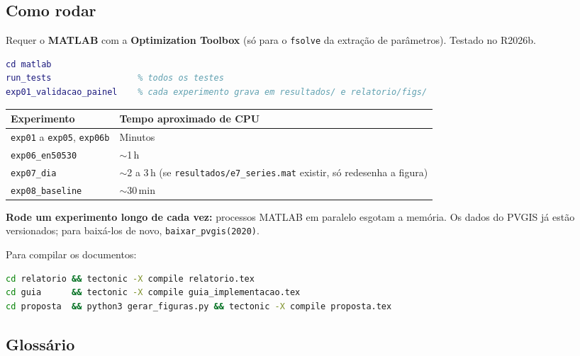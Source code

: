\subsection{Como rodar}

Requer o \textbf{MATLAB} com a \textbf{Optimization Toolbox} (s\'o para o \texttt{fsolve} da extra\c{c}\~ao de par\^ametros). Testado no R2026b.

\begin{lstlisting}[language=Matlab,style=matlabcod,numbers=none]
cd matlab
run_tests                 % todos os testes
exp01_validacao_painel    % cada experimento grava em resultados/ e relatorio/figs/
\end{lstlisting}

\begin{center}\small
\begin{tabular}{@{}ll@{}}
\toprule
Experimento & Tempo aproximado de CPU \\ \midrule
\texttt{exp01} a \texttt{exp05}, \texttt{exp06b} & Minutos \\
\texttt{exp06\_en50530} & $\sim$1\,h \\
\texttt{exp07\_dia} & $\sim$2 a 3\,h (se \texttt{resultados/e7\_series.mat} existir, s\'o redesenha a figura) \\
\texttt{exp08\_baseline} & $\sim$30\,min \\
\bottomrule
\end{tabular}
\end{center}

\textbf{Rode um experimento longo de cada vez:} processos MATLAB em paralelo esgotam a mem\'oria. Os dados do PVGIS j\'a est\~ao versionados; para baix\'a-los de novo, \texttt{baixar\_pvgis(2020)}.

Para compilar os documentos:
\begin{lstlisting}[language=bash,numbers=none,basicstyle=\ttfamily\scriptsize]
cd relatorio && tectonic -X compile relatorio.tex
cd guia      && tectonic -X compile guia_implementacao.tex
cd proposta  && python3 gerar_figuras.py && tectonic -X compile proposta.tex
\end{lstlisting}

\subsection{Gloss\'ario}

